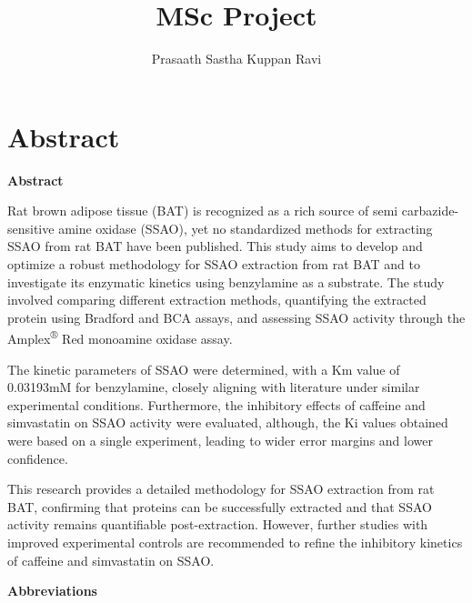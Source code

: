 \documentclass[
  letterpaper,
  DIV=11,
  numbers=noendperiod]{scrreprt}
\title{MSc Project}
\author{Prasaath Sastha Kuppan Ravi}
\date{}
\renewcommand*\contentsname{Table of contents}
\newcommand\contentsname{Table of contents}
\begin{document}
\maketitle

\renewcommand*\contentsname{Table of contents}
{
\hypersetup{linkcolor=}
\setcounter{tocdepth}{2}
\tableofcontents
}


\chapter{Abstract}\label{abstract}

\textbf{Abstract}

Rat brown adipose tissue (BAT) is recognized as a rich source of semi
carbazide-sensitive amine oxidase (SSAO), yet no standardized methods
for extracting SSAO from rat BAT have been published. This study aims to
develop and optimize a robust methodology for SSAO extraction from rat
BAT and to investigate its enzymatic kinetics using benzylamine as a
substrate. The study involved comparing different extraction methods,
quantifying the extracted protein using Bradford and BCA assays, and
assessing SSAO activity through the Amplex\textsuperscript{®} Red
monoamine oxidase assay.

The kinetic parameters of SSAO were determined, with a Km value of
0.03193mM for benzylamine, closely aligning with literature under
similar experimental conditions. Furthermore, the inhibitory effects of
caffeine and simvastatin on SSAO activity were evaluated, although, the
Ki values obtained were based on a single experiment, leading to wider
error margins and lower confidence.

This research provides a detailed methodology for SSAO extraction from
rat BAT, confirming that proteins can be successfully extracted and that
SSAO activity remains quantifiable post-extraction. However, further
studies with improved experimental controls are recommended to refine
the inhibitory kinetics of caffeine and simvastatin on SSAO.

\textbf{Abbreviations}
\end{document}
